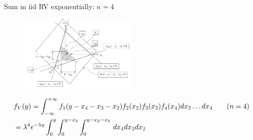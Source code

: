 \documentclass[asd-beamer.tex]{subfiles}
\begin{document}
\begin{wordonframe}{Sum m iid RV exponentially: $n=4$}
	\begin{figure}[!ht]\includegraphics[trim={0cm 0cm 0 0},clip, keepaspectratio,width=0.5\textwidth]{figures/internet/sumRV-integration}\label{fig:sumRV-integration}
	\end{figure}
	\begin{align*}
	&f_Y(y)=\int_{-\infty}^{+\infty}{}f_1(y-x_4-x_3-x_2)f_2(x_2)f_3(x_3)f_4(x_4)dx_2\ldots dx_4\tag{$n=4$}\\
	&=\lambda^4e^{-\lambda y}\int_0^y\int_0^{y-x_2}\int_0^{y-x_2-x_3}\,dx_4dx_3dx_2\\
	\end{align*}
\end{wordonframe}
\end{document}
